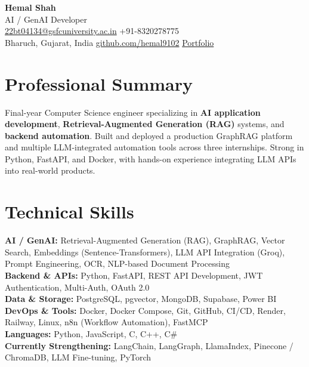 \documentclass[a4paper,8pt]{extarticle}
\begin{document}
\begin{center}
  {\Huge \bfseries \color{primary} Hemal Shah}\\[4pt]
  {\large \color{accent} AI / GenAI Developer}\\[6pt]
  \small
  \href{mailto:22bt04134@gsfcuniversity.ac.in}{22bt04134@gsfcuniversity.ac.in} \quad
  +91-8320278775\\
  Bharuch, Gujarat, India \quad
  \href{https://github.com/hemal9102}{github.com/hemal9102} \quad
  \href{https://hemal9102.github.io/portfolio_HK/}{Portfolio}
\end{center}

\section{Professional Summary}
Final-year Computer Science engineer specializing in \textbf{AI application development},
\textbf{Retrieval-Augmented Generation (RAG)} systems, and \textbf{backend automation}.
Built and deployed a production GraphRAG platform and multiple LLM-integrated automation
tools across three internships. Strong in Python, FastAPI, and Docker, with hands-on
experience integrating LLM APIs into real-world products.

\section{Technical Skills}
\textbf{AI / GenAI:} Retrieval-Augmented Generation (RAG), GraphRAG, Vector Search,
Embeddings (Sentence-Transformers), LLM API Integration (Groq), Prompt Engineering,
OCR, NLP-based Document Processing\\
\textbf{Backend \& APIs:} Python, FastAPI, REST API Development, JWT Authentication,
Multi-Auth, OAuth 2.0\\
\textbf{Data \& Storage:} PostgreSQL, pgvector, MongoDB, Supabase, Power BI\\
\textbf{DevOps \& Tools:} Docker, Docker Compose, Git, GitHub, CI/CD, Render, Railway,
Linux, n8n (Workflow Automation), FastMCP\\
\textbf{Languages:} Python, JavaScript, C, C++, C\#\\
\textbf{Currently Strengthening:} LangChain, LangGraph, LlamaIndex, Pinecone / ChromaDB,
LLM Fine-tuning, PyTorch
\end{document}
